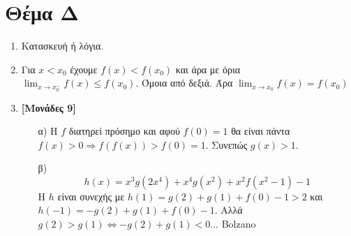 \documentclass[12pt]{article}
\begin{document}
  \section*{Θέμα Δ}
    \noindent
    \begin{enumerate}
      \item Κατασκευή ή λόγια.
      \item Για $x<x_0$ έχουμε $f(x)<f(x_0)$ και άρα με όρια $\lim_{x\to x_0^-}f(x)\le f(x_0)$. Όμοια από δεξιά. Άρα $\lim_{x\to x_0}f(x)=f(x_0)$
      \item \textbf{[Μονάδες 9]}
      \begin{enumerate}
        \item [α)] Η $f$ διατηρεί πρόσημο και αφού $f(0)=1$ θα είναι πάντα $f(x)>0 \Rightarrow f(f(x))>f(0)=1$. Συνεπώς $g(x) > 1$.
        \item [β)] $$h(x) = x^3g\left(2x^4\right)+x^4g\left(x^2\right)+x^2f\left(x^2-1\right)-1$$ Η $h$ είναι συνεχής με $h(1)=g(2)+g(1)+f(0)-1>2$ και $h(-1)=-g(2)+g(1)+f(0)-1$. Αλλά $g(2)>g(1) \iff -g(2)+g(1)<0$... Bolzano
      \end{enumerate}
    \end{enumerate}

\vspace{3\baselineskip}
\end{document}
